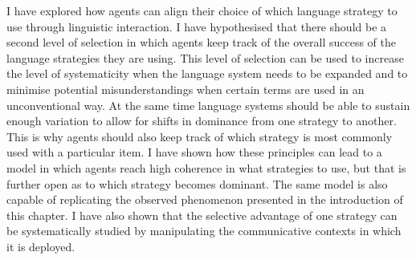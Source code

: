 I have explored how agents can align their choice of which language
strategy to use through linguistic interaction. I have hypothesised
that there should be a second level of selection in which agents keep
track of the overall success of the language strategies they are
using. This level of selection can be used to increase the level of
systematicity when the language system needs to be expanded and to
minimise potential misunderstandings when certain terms are used in an
unconventional way. At the same time language systems should be able
to sustain enough variation to allow for shifts in dominance from one
strategy to another. This is why agents should also keep track of
which strategy is most commonly used with a particular item. I have
shown how these principles can lead to a model in which agents reach
high coherence in what strategies to use, but that is further open as to
which strategy becomes dominant. The same model is also capable of
replicating the observed phenomenon presented in the introduction of
this chapter. I have also shown that the selective advantage of one
strategy can be systematically studied by manipulating the
communicative contexts in which it is deployed.